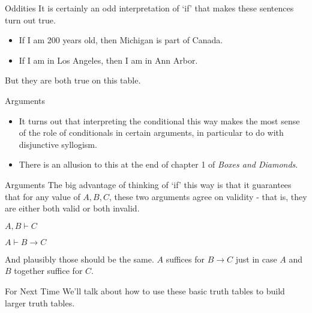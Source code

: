 \documentclass[
  ignorenonframetext,
]{beamer}
\providecommand{\tightlist}{%
  \setlength{\itemsep}{0pt}\setlength{\parskip}{0pt}}
\renewcommand{\,}{\text{, }}
\renewenvironment*{quote}	
	{\list{}{\rightmargin   \leftmargin} \item } 	
	{\endlist }
\begin{document}
\begin{frame}{Oddities}
\protect\hypertarget{oddities}{}
It is certainly an odd interpretation of `if' that makes these sentences
turn out true.

\begin{itemize}
\tightlist
\item
  If I am 200 years old, then Michigan is part of Canada.
\item
  If I am in Los Angeles, then I am in Ann Arbor.
\end{itemize}

But they are both true on this table.
\end{frame}

\begin{frame}{Arguments}
\protect\hypertarget{arguments}{}
\begin{itemize}
\tightlist
\item
  It turns out that interpreting the conditional this way makes the most
  sense of the role of conditionals in certain arguments, in particular
  to do with disjunctive syllogism.
\item
  There is an allusion to this at the end of chapter 1 of \emph{Boxes
  and Diamonds}.
\end{itemize}
\end{frame}

\begin{frame}{Arguments}
\protect\hypertarget{arguments-1}{}
The big advantage of thinking of `if' this way is that it guarantees
that for any value of \(A, B, C\), these two arguments agree on validity
- that is, they are either both valid or both invalid.

\begin{quote}
\(A, B \vdash C\)
\end{quote}

\begin{quote}
\(A \vdash B \rightarrow C\)
\end{quote}

And plausibly those should be the same. \(A\) suffices for
\(B \rightarrow C\) just in case \(A\) and \(B\) together suffice for
\(C\).
\end{frame}

\begin{frame}{For Next Time}
\protect\hypertarget{for-next-time}{}
We'll talk about how to use these basic truth tables to build larger
truth tables.
\end{frame}
\end{document}
